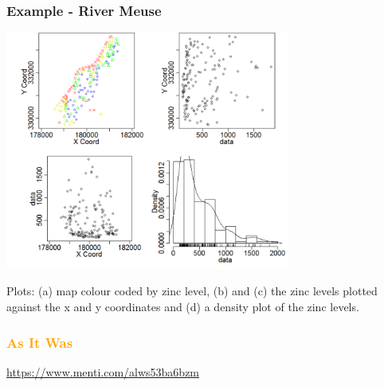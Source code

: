 \documentclass[parskip,12pt]{beamer}
\begin{document}
\begin{frame}
\frametitle{Example - River Meuse}
\vspace{1mm}    
    \begin{center}
     \includegraphics[width=0.7\textwidth]{MeuseRaw}
          \end{center}
\vspace{-2mm}          
Plots: (a) map colour coded by zinc level, (b) and (c) the zinc levels plotted against the x and y coordinates and (d) a density plot of the zinc levels.
\end{frame}

\begin{frame}
\frametitle{\textcolor{orange}{As It Was}}
\vspace{-3mm}
\url{https://www.menti.com/alws53ba6bzm}
\end{frame}
\end{document}
